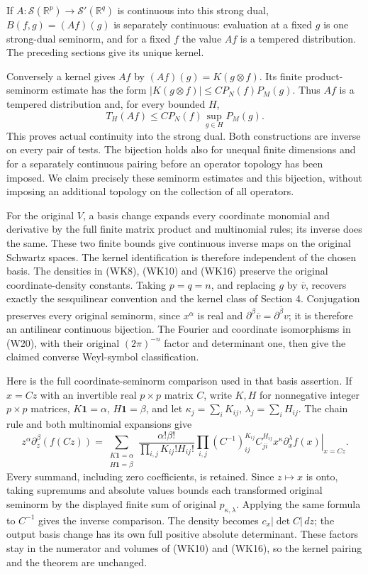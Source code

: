\documentclass[
  11pt,
]{article}
\begin{document}
If \(A:\mathcal S(\mathbb R^p)\to\mathcal S'(\mathbb R^q)\) is
continuous into this strong dual, \(B(f,g)=(Af)(g)\) is separately
continuous: evaluation at a fixed \(g\) is one strong-dual seminorm, and
for a fixed \(f\) the value \(Af\) is a tempered distribution. The
preceding sections give its unique kernel.

Conversely a kernel gives \(Af\) by \((Af)(g)=K(g\otimes f)\). Its
finite product-seminorm estimate has the form
\(|K(g\otimes f)|\leq C P_N(f)P_M(g)\). Thus \(Af\) is a tempered
distribution and, for every bounded \(H\), \[
 T_H(Af)\leq C P_N(f)\sup_{g\in H}P_M(g).
 \tag{WK23}
\] This proves actual continuity into the strong dual. Both
constructions are inverse on every pair of tests. The bijection holds
also for unequal finite dimensions and for a separately continuous
pairing before an operator topology has been imposed. We claim precisely
these seminorm estimates and this bijection, without imposing an
additional topology on the collection of all operators.

For the original \(V\), a basis change expands every coordinate monomial
and derivative by the full finite matrix product and multinomial rules;
its inverse does the same. These two finite bounds give continuous
inverse maps on the original Schwartz spaces. The kernel identification
is therefore independent of the chosen basis. The densities in (WK8),
(WK10) and (WK16) preserve the original coordinate-density constants.
Taking \(p=q=n\), and replacing \(g\) by \(\overline v\), recovers
exactly the sesquilinear convention and the kernel class of Section 4.
Conjugation preserves every original seminorm, since \(x^\alpha\) is
real and \(\partial^\beta\overline v=\overline{\partial^\beta v}\); it
is therefore an antilinear continuous bijection. The Fourier and
coordinate isomorphisms in (W20), with their original \((2\pi)^{-n}\)
factor and determinant one, then give the claimed converse Weyl-symbol
classification.

Here is the full coordinate-seminorm comparison used in that basis
assertion. If \(x=Cz\) with an invertible real \(p\times p\) matrix
\(C\), write \(K,H\) for nonnegative integer \(p\times p\) matrices,
\(K\mathbf1=\alpha\), \(H\mathbf1=\beta\), and let
\(\kappa_j=\sum_iK_{ij}\), \(\lambda_j=\sum_iH_{ij}\). The chain rule
and both multinomial expansions give \[
 z^\alpha\partial_z^\beta(f(Cz))=
 \sum_{\substack{K\mathbf1=\alpha\\H\mathbf1=\beta}}
 \frac{\alpha!\beta!}{\prod_{i,j}K_{ij}!H_{ij}!}
 \prod_{i,j}(C^{-1})_{ij}^{K_{ij}}C_{ji}^{H_{ij}}
 \left.x^\kappa\partial_x^\lambda f(x)\right|_{x=Cz}.
 \tag{WK24}
\] Every summand, including zero coefficients, is retained. Since
\(z\mapsto x\) is onto, taking supremums and absolute values bounds each
transformed original seminorm by the displayed finite sum of original
\(p_{\kappa,\lambda}\). Applying the same formula to \(C^{-1}\) gives
the inverse comparison. The density becomes \(c_x|\det C|\,dz\); the
output basis change has its own full positive absolute determinant.
These factors stay in the numerator and volumes of (WK10) and (WK16), so
the kernel pairing and the theorem are unchanged.
\end{document}
